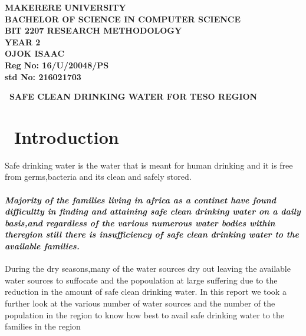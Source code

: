 \documentclass[a4paper,12pt]{article}
\begin{document}
\begin{Huge}
\begin{center}
\begin{normalsize}

\textbf{MAKERERE UNIVERSITY } \\
\textbf{BACHELOR OF SCIENCE IN COMPUTER SCIENCE} \\
\textbf{BIT 2207 RESEARCH METHODOLOGY} \\
\textbf{YEAR 2} \\ 



\textbf{\sc OJOK ISAAC } \\
\textbf{\sc Reg No: 16/U/20048/PS } \\
\textbf{\sc std No: 216021703}\\
\end{normalsize}
\end{center}
\end{Huge}
\newpage

\begin{Huge}
\begin{center}
\begin{normalsize}
\textbf{\  SAFE  CLEAN DRINKING WATER FOR TESO REGION}
\end{normalsize}
\end{center}
\end{Huge}
\section{\  Introduction}
Safe drinking water is the water that is meant for human drinking and it is free from germs,bacteria and its clean and safely stored.
\paragraph{\sl  Majority of the families living in africa as a continet have found difficultty in finding and attaining safe clean drinking water on a daily basis,and regardless of the various numerous water bodies within theregion  still there is insufficiency of safe clean drinking water to the available families.}
During the dry seasons,many of the water sources dry out leaving the available water sources to suffocate and the popoulation at large suffering due to the reduction in the amount of safe clean drinking water.
In this report we took a further look at the various number of water sources and the number of the population in the region to know how best to avail safe drinking water to the families in the region
\end{document}
